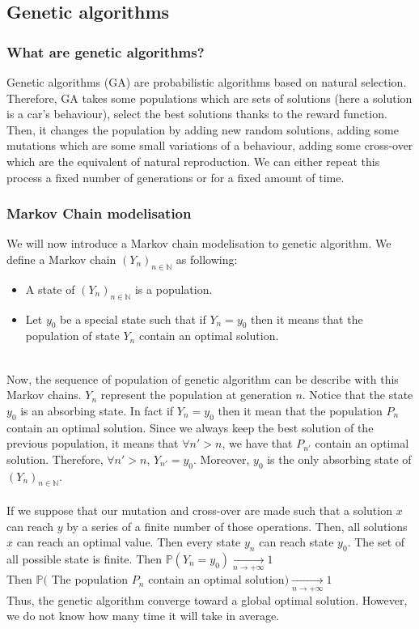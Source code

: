 \documentclass[11pt,a4paper]{article}
\newcommand{\tab}{\phantom{xxx}}
\newcommand{\mlist}[1]{\begin{itemize}[noitemsep,topsep=0pt]#1\end{itemize}}
\begin{document}
	
		\subsection*{Genetic algorithms}
			\subsubsection*{What are genetic algorithms?}
Genetic algorithms (GA) are probabilistic algorithms based on natural selection. Therefore, GA takes some populations which are sets of solutions (here a solution is a car's behaviour), select the best solutions thanks to the reward function. Then, it changes the population by adding new random solutions, adding some mutations which are some small variations of a behaviour, adding some cross-over which are the equivalent of natural reproduction. We can either repeat this process a fixed number of generations or for a fixed amount of time.
		
			\subsubsection*{Markov Chain modelisation}
We will now introduce a Markov chain modelisation to genetic algorithm. We define a Markov chain $(Y_n)_{n\in\mathbb{N}}$ as following:
\mlist{
\item A state of $(Y_n)_{n\in\mathbb{N}}$ is a population.
\item Let $y_0$ be a special state such that if $Y_n = y_0$ then it means that the population of state $Y_n$ contain an optimal solution.
}
\tab \\
Now, the sequence of population of genetic algorithm can be describe with this Markov chains. $Y_n$ represent the population at generation $n$. Notice that the state $y_0$ is an absorbing state. In fact if $Y_n = y_0$ then it mean that the population $P_n$ contain an optimal solution. Since we always keep the best solution of the previous population, it means that $\forall n'>n$, we have that $P_{n'}$ contain an optimal solution. Therefore, $\forall n'>n$, $Y_{n'} = y_0$. Moreover, $y_0$ is the only absorbing state of $(Y_n)_{n\in\mathbb{N}}$.\\
\\
If we suppose that our mutation and cross-over are made such that a solution $x$ can reach $y$ by a series of a finite number of those operations. Then, all solutions $x$ can reach an optimal value. Then every state $y_n$ can reach state $y_0$. The set of all possible state is finite. Then $\mathbb{P}(Y_n = y_0) \underset{n \rightarrow +\infty}{\rightarrow} 1$\\
Then $\mathbb{P}($ The population $P_n$ contain an optimal solution$) \underset{n \rightarrow +\infty}{\rightarrow} 1$\\
Thus, the genetic algorithm converge toward a global optimal solution. However, we do not know how many time it will take in average.
		
\end{document}
